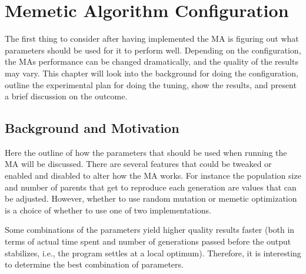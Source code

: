 \chapter{Memetic Algorithm Configuration} %
\label{cha:evolutionary_algorithm_configuration}

The first thing to consider after having implemented the MA is figuring out what parameters should be used for it to perform well. Depending on the configuration, the MAs performance can be changed dramatically, and the quality of the results may vary. This chapter will look into the background for doing the configuration, outline the experimental plan for doing the tuning, show the results, and present a brief discussion on the outcome.

\section{Background and Motivation} %
\label{sec:background_and_motivation}
Here the outline of how the parameters that should be used when running the MA will be discussed. There are several features that could be tweaked or enabled and disabled to alter how the MA works. For instance the population size and number of parents that get to reproduce each generation are values that can be adjusted. However, whether to use random mutation or memetic optimization is a choice of whether to use one of two implementations.

Some combinations of the parameters yield higher quality results faster (both in terms of actual time spent and number of generations passed before the output stabilizes, i.e., the program settles at a local optimum). Therefore, it is interesting to determine the best combination of parameters.

